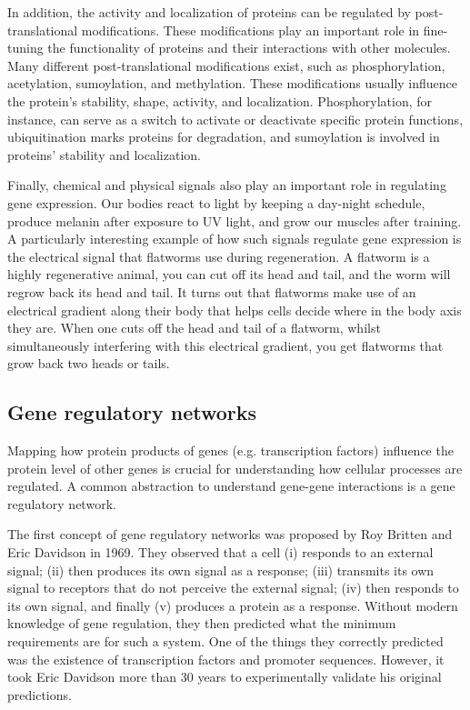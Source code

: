 In addition, the activity and localization of proteins can be regulated by post-translational modifications\cite{Ramazi2021}. These modifications play an important role in fine-tuning the functionality of proteins and their interactions with other molecules. Many different post-translational modifications exist, such as phosphorylation, acetylation, sumoylation, and methylation. These modifications usually influence the protein's stability, shape, activity, and localization. Phosphorylation, for instance, can serve as a switch to activate or deactivate specific protein functions\cite{Cohen2002}, ubiquitination marks proteins for degradation, and sumoylation is involved in proteins' stability and localization\cite{Mazur2012}.

Finally, chemical and physical signals also play an important role in regulating gene expression. Our bodies react to light by keeping a day-night schedule, produce melanin after exposure to UV light, and grow our muscles after training. A particularly interesting example of how such signals regulate gene expression is the electrical signal that flatworms use during regeneration. A flatworm is a highly regenerative animal, you can cut off its head and tail, and the worm will regrow back its head and tail. It turns out that flatworms make use of an electrical gradient along their body that helps cells decide where in the body axis they are. When one cuts off the head and tail of a flatworm, whilst simultaneously interfering with this electrical gradient, you get flatworms that grow back two heads or tails\cite{Levin2014}.

\subsection{Gene regulatory networks}

Mapping how protein products of genes (e.g. transcription factors) influence the protein level of other genes is crucial for understanding how cellular processes are regulated. A common abstraction to understand gene-gene interactions is a gene regulatory network.

The first concept of gene regulatory networks was proposed by Roy Britten and Eric Davidson in 1969\cite{Britten_1969}. They observed that a cell (i) responds to an external signal; (ii) then produces its own signal as a response; (iii) transmits its own signal to receptors that do not perceive the external signal; (iv) then responds to its own signal, and finally (v) produces a protein as a response. Without modern knowledge of gene regulation, they then predicted what the minimum requirements are for such a system. One of the things they correctly predicted was the existence of transcription factors and promoter sequences. However, it took Eric Davidson more than 30 years to experimentally validate his original predictions\cite{Davidson_2002}.

